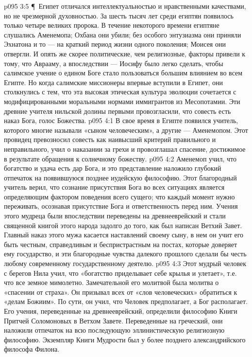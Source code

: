 \vs p095 3:5 \P\ Египет отличался интеллектуальностью и нравственными качествами, но не чрезмерной духовностью. За шесть тысяч лет среди египтян появилось только четыре великих пророка. В течение некоторого времени египтяне слушались Аменемопа; Охбана они убили; без особого энтузиазма они приняли Эхнатона и то --- на краткий период жизни одного поколения; Моисея они отвергли. И опять же скорее политические, чем религиозные, факторы привели к тому, что Аврааму, а впоследствии --- Иосифу было легко сделать, чтобы салимское учение о едином Боге стало пользоваться большим влиянием во всем Египте. Но когда салимские миссионеры впервые вступили в Египет, они столкнулись с тем, что эта высокая этическая культура эволюции сочетается с модифицированными моральными нормами иммигрантов из Месопотамии. Эти древние учителя нильской долины первыми провозгласили, что совесть есть наказ Бога, голос Божества.
\vs p095 4:1 В свое время в Египте появился учитель, которого многие называли «сыном человеческим», а другие --- Аменемопом. Этот провидец превозносил совесть как наивысший критерий правильного и неправильного, учил о наказании за грехи и провозглашал спасение, достижимое в результате обращения к солнечному божеству.
\vs p095 4:2 Аменемоп учил, что богатство и удача есть дар Бога, и это представление наложило глубокий отпечаток на появившуюся позднее иудейскую философию. Этот благородный учитель верил, что сознание присутствия Бога во всех ситуациях является определяющим фактором поведения всего сущего; что каждый момент нужно переживать, осознавая присутствие Бога и ответственность перед ним. Учения этого мудреца были впоследствии переведены на древнееврейский и стали священной книгой этого народа задолго до того, как был написан Ветхий Завет. Главный наказ этого мужа касается наставлений своему сыну, в нем он учит его быть честным, справедливым и беспристрастным на постах, которые доверяет ему государство, и эти благородные чувства далекого прошлого сделали бы честь любому современному государственному деятелю.
\vs p095 4:3 Этот мудрый человек с берегов Нила учил, что «богатство приделывает себе крылья и улетает», т.е. что все земное мимолетно. Замечательной его молитвой была молитва о «спасении от страха». Он призывал всех от «слов человеческих» обратиться к «делам Божиим». По сути, он учил, что Человек предполагает, а Бог располагает. Его учения, переведенные на древнееврейский, определили философию Книги Притчей Соломоновых в Ветхом Завете. Переведенные на греческий, они наложили отпечаток на всю последующую эллинистическую религиозную философию. Экземпляр Книги Мудрости был у более позднего александрийского философа Филона.
